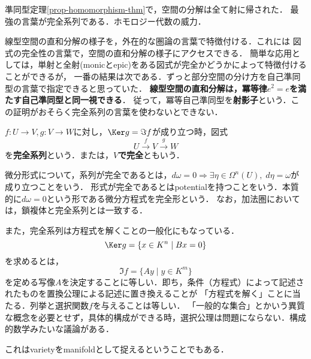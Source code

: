 \documentclass[uplatex, dvipdfmx]{jsreport}
\begin{document}
\begin{tcolorbox}[colframe=ForestGreen, colback=ForestGreen!10!white, breakable,
    title=完全系列という言葉]
    準同型定理\ref{prop-homomorphism-thm}で，空間の分解は全て射に帰された．
    最強の言葉が完全系列である．ホモロジー代数の威力．

    線型空間の直和分解の様子を，外在的な圏論の言葉で特徴付ける．これには
    図式の完全性の言葉で，空間の直和分解の様子にアクセスできる．
    簡単な応用としては，単射と全射(monicとepic)をある図式が完全かどうかによって特徴付けることができるが，
    一番の結果は次である．ずっと部分空間の分け方を自己準同型の言葉で指定できると思っていた．
    \textbf{線型空間の直和分解は，冪等律$e^2=e$を満たす自己準同型と同一視できる}．
    従って，冪等自己準同型を\textbf{射影子}という．この証明がおそらく完全系列の言葉を使わないとできない．
\end{tcolorbox}

\begin{definition}
    $f:U\to V,g:V\to W$に対し，$\Ker g=\Im f$が成り立つ時，図式
    \[ U\xrightarrow{f}V\xrightarrow{g}W \]
    を\textbf{完全系列}という．または，\textbf{$V$で完全}ともいう．
\end{definition}
\begin{remark}
    微分形式について，系列が完全であるとは，$d\omega=0\Rightarrow\exists\eta\in\Omega^n(U),\;d\eta=\omega$が成り立つことをいう．
    形式が完全であるとはpotentialを持つことをいう．本質的に$d\omega=0$という形である微分方程式を完全形という．
    なお，加法圏においては，鎖複体と完全系列とは一致する．

    また，完全系列は方程式を解くことの一般化にもなっている．
    \[\Ker g=\{x\in K^n\mid Bx=0\}\]
    を求めるとは，
    \[ \Im f=\{Ay\mid y\in K^m\} \]
    を定める写像$A$を決定することに等しい．即ち，条件（方程式）によって記述されたものを置換公理による記述に置き換えることが
    「方程式を解く」ことに当たる．列挙と選択関数$f$を与えることは等しい．
    「一般的な集合」とかいう異質な概念を必要とせず，具体的構成ができる時，選択公理は問題にならない．構成的数学みたいな議論がある．

    これはvarietyをmanifoldとして捉えるということでもある．
\end{remark}
\end{document}
